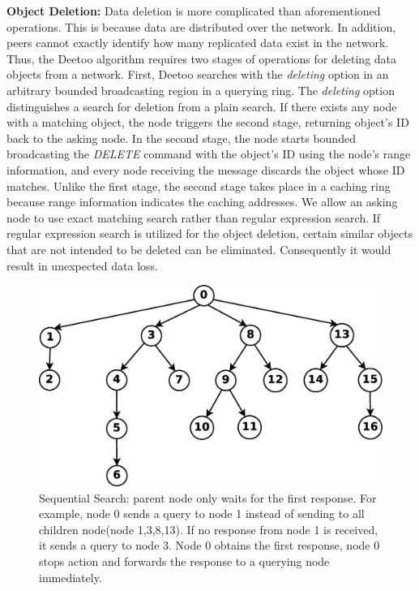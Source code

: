\documentclass[conference]{IEEEtran}
\begin{document}
\textbf{Object Deletion:} Data deletion is more complicated than aforementioned operations.
This is because data are distributed over the network. In addition, peers cannot exactly identify 
how many replicated data exist in the network.
Thus, the Deetoo algorithm requires two stages of operations for deleting data objects from a network. 
First, Deetoo searches with the \textit{deleting} option 
in an arbitrary bounded broadcasting region in a querying ring. The \textit{deleting} 
option distinguishes a search for deletion from a plain search.
If there exists any node with a matching object, the node triggers the second stage, returning 
object's ID back to the asking node. 
In the second stage, the node starts bounded broadcasting the \textit{DELETE} command with the object's ID using 
the node's range information, and every node receiving the message discards the object whose ID matches.
Unlike the first stage, the second stage takes place in a caching ring because range 
information indicates the caching addresses.
We allow an asking node to use exact matching search rather than regular expression search. 
If regular expression search is utilized for the object deletion, 
certain similar objects that are not intended to be deleted can be eliminated. 
Consequently it would result in unexpected data loss.

\begin{figure}
\centering
\includegraphics[width=3 in]{regextree}
\caption{Sequential Search: parent node only waits for the first response. For example, 
node 0 sends a query to node 1 instead of sending to all children node(node 1,3,8,13). 
If no response from node 1 is received, it sends a query to node 3. Node 0 obtains the first 
response, node 0 stops action and forwards the response to a querying node immediately.} 
\label{fig:regextree}
\end{figure}
\fi
\end{document}
